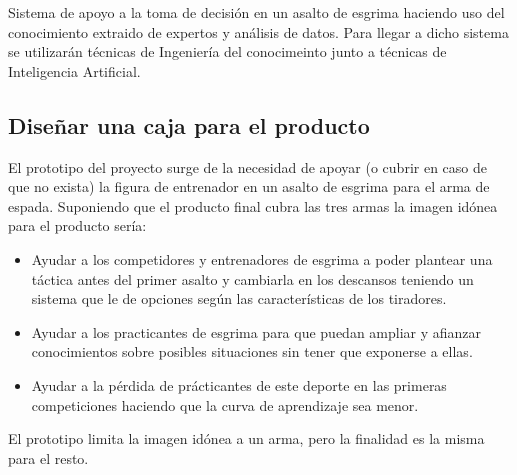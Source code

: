 Sistema de apoyo a la toma de decisión en un asalto de esgrima haciendo uso del
conocimiento extraido de expertos y análisis de datos. Para llegar a dicho sistema
se utilizarán técnicas de Ingeniería del conocimeinto junto a técnicas de Inteligencia
Artificial.

\subsection{Diseñar una caja para el producto}
El prototipo del proyecto surge de la necesidad de apoyar (o cubrir en caso de que no exista)
la figura de entrenador en un asalto de esgrima para el arma de espada. Suponiendo que el
producto final cubra las tres armas la imagen idónea para el producto sería:

\begin{itemize}
  \item Ayudar a los competidores y entrenadores de esgrima a poder plantear una táctica antes
    del primer asalto y cambiarla en los descansos teniendo un sistema
    que le de opciones según las características de los tiradores.
  \item Ayudar a los practicantes de esgrima para que puedan ampliar y afianzar conocimientos
    sobre posibles situaciones sin tener que exponerse a ellas.
  \item Ayudar a la pérdida de prácticantes de este deporte en las primeras competiciones haciendo
    que la curva de aprendizaje sea menor.
\end{itemize}

El prototipo limita la imagen idónea a un arma, pero la finalidad es la misma para el resto.
